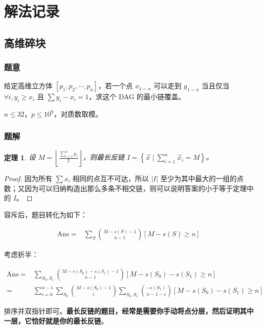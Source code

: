 \documentclass[12pt, a4paper, oneside]{ctexart}
\newtheorem{theorem}{定理}[subsection]
\begin{document}
\newpage
\section{解法记录}

\subsection{高维碎块}

\subsubsection{题意}

给定高维立方体 $[p_1,p_2,\cdots,p_n]$，若一个点 $x_{1\sim n}$ 可以走到 $y_{1\sim n}$ 当且仅当 $\forall i,y_i\ge x_i$ 且 $\sum y_i-x_i=1$，求这个 DAG 的最小链覆盖。

$n\le 32$，$p\le 10^9$，对质数取模。

\subsubsection{题解}

\begin{theorem}
    设 $M=\left\lfloor\frac {\sum_{i=1}^n p_i}2 \right\rfloor$，则最长反链 $I=\left\{\vec{x} \mid \sum_{i=1}^n {\vec{x}}_{i}=M\right\}$。
\end{theorem}

\begin{proof}
    因为所有 $\sum x_i$ 相同的点互不可达，所以 $|I|$ 至少为其中最大的一组的点数；又因为可以归纳构造出那么多条不相交链，则可以说明答案的小于等于定理中的 $I$。
\end{proof}

容斥后，题目转化为如下：

\begin{align*}
    \mathrm{Ans}=&\sum_{S} \binom{M-s(S)-1}{n-1}[M-s(S)\ge n]
\end{align*}

考虑折半：

\begin{align*}
    \mathrm{Ans}=&\sum_{S_0,S_1} \binom{M-s(S_0)-s(S_1)-1}{n-1}[M-s(S_0)-s(S_1)\ge n]\\
    =&\sum_{i=0}^{n-1}\sum_{S_0} \binom{M-s(S_0)-1}{i}\sum_{S_0,S_1} \binom{-s(S_1)}{n-1-i}[M-s(S_0)-s(S_1)\ge n]
\end{align*}

排序并双指针即可。\textbf{最长反链的题目，经常是需要你手动将点分层，然后证明其中一层，它恰好就是你的最长反链}。
\end{document}
